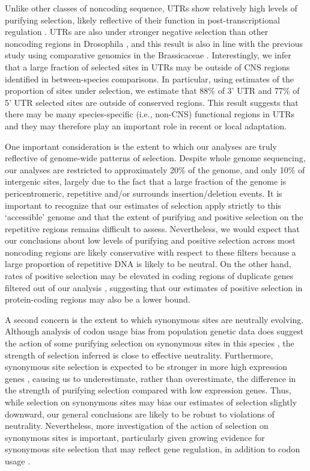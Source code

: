 Unlike other classes of noncoding sequence, UTRs show relatively high levels of purifying selection, likely reflective of their function in post-transcriptional regulation \citep{kim2014}. UTRs are also under stronger negative selection than other noncoding regions in Drosophila \citep{andolfatto2005}, and this result is also in line with the previous study using comparative genomics in the Brassicaceae \citep{Haudry2013-qe}. Interestingly, we infer that a large fraction of selected sites in UTRs may be outside of CNS regions identified in between-species comparisons. In particular, using estimates of the proportion of sites under selection, we estimate that 88\% of 3’ UTR and 77\% of 5’ UTR selected sites are outside of conserved regions.  This result suggests that there may be many species-specific (i.e., non-CNS) functional regions in UTRs and they may therefore play an important role in recent or local adaptation.

One important consideration is the extent to which our analyses are truly reflective of genome-wide patterns of selection. Despite whole genome sequencing, our analyses are restricted to approximately 20\% of the genome, and only 10\% of intergenic sites, largely due to the fact that a large fraction of the genome is pericentromeric, repetitive and/or surrounds insertion/deletion events. It is important to recognize that our estimates of selection apply strictly to this ‘accessible’ genome and that the extent of purifying and positive selection on the repetitive regions remains difficult to assess. Nevertheless, we would expect that our conclusions about low levels of purifying and positive selection across most noncoding regions are likely conservative with respect to these filters because a large proportion of repetitive DNA is likely to be neutral. On the other hand, rates of positive selection may be elevated in coding regions of duplicate genes filtered out of our analysis \citep{han2009}, suggesting that our estimates of positive selection in protein-coding regions may also be a lower bound.   

A second concern is the extent to which synonymous sites are neutrally evolving. Although analysis of codon usage bias from population genetic data does suggest the action of some purifying selection on synonymous sites in this species \citep{qiu2011}, the strength of selection inferred is close to effective neutrality. Furthermore, synonymous site selection is expected to be stronger in more high expression genes \citep{park2013,wright2004}, causing us to underestimate, rather than overestimate, the difference in the strength of purifying selection compared with low expression genes. Thus, while selection on synonymous sites may bias our estimates of selection slightly downward, our general conclusions are likely to be robust to violations of neutrality. Nevertheless, more investigation of the action of selection on synonymous sites is important, particularly given growing evidence for synonymous site selection that may reflect gene regulation, in addition to codon usage \citep{duret1999,marais2001}.

